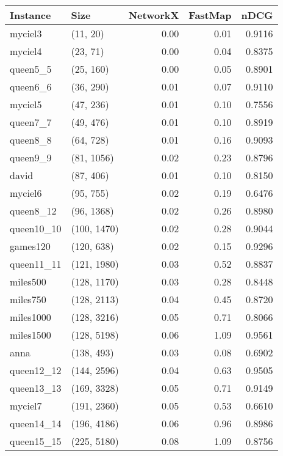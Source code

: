 \begin{tabular}{llrrr}
\toprule
  Instance &         Size &  NetworkX &  FastMap &   nDCG \\
\midrule
   myciel3 &     (11, 20) &      0.00 &     0.01 & 0.9116 \\
   myciel4 &     (23, 71) &      0.00 &     0.04 & 0.8375 \\
  queen5\_5 &    (25, 160) &      0.00 &     0.05 & 0.8901 \\
  queen6\_6 &    (36, 290) &      0.01 &     0.07 & 0.9110 \\
   myciel5 &    (47, 236) &      0.01 &     0.10 & 0.7556 \\
  queen7\_7 &    (49, 476) &      0.01 &     0.10 & 0.8919 \\
  queen8\_8 &    (64, 728) &      0.01 &     0.16 & 0.9093 \\
  queen9\_9 &   (81, 1056) &      0.02 &     0.23 & 0.8796 \\
     david &    (87, 406) &      0.01 &     0.10 & 0.8150 \\
   myciel6 &    (95, 755) &      0.02 &     0.19 & 0.6476 \\
 queen8\_12 &   (96, 1368) &      0.02 &     0.26 & 0.8980 \\
queen10\_10 &  (100, 1470) &      0.02 &     0.28 & 0.9044 \\
  games120 &   (120, 638) &      0.02 &     0.15 & 0.9296 \\
queen11\_11 &  (121, 1980) &      0.03 &     0.52 & 0.8837 \\
  miles500 &  (128, 1170) &      0.03 &     0.28 & 0.8448 \\
  miles750 &  (128, 2113) &      0.04 &     0.45 & 0.8720 \\
 miles1000 &  (128, 3216) &      0.05 &     0.71 & 0.8066 \\
 miles1500 &  (128, 5198) &      0.06 &     1.09 & 0.9561 \\
      anna &   (138, 493) &      0.03 &     0.08 & 0.6902 \\
queen12\_12 &  (144, 2596) &      0.04 &     0.63 & 0.9505 \\
queen13\_13 &  (169, 3328) &      0.05 &     0.71 & 0.9149 \\
   myciel7 &  (191, 2360) &      0.05 &     0.53 & 0.6610 \\
queen14\_14 &  (196, 4186) &      0.06 &     0.96 & 0.8986 \\
queen15\_15 &  (225, 5180) &      0.08 &     1.09 & 0.8756 \\

\end{tabular}
